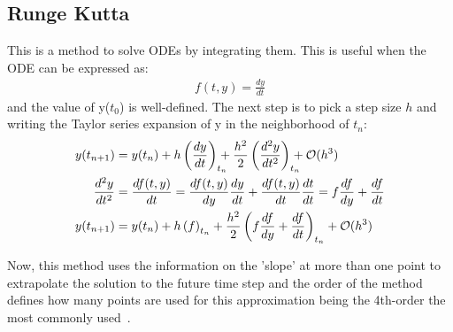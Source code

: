 \documentclass[class={myRUCProject}, crop=false]{standalone}
\begin{document}
\subsection{Runge Kutta}
This is a method to solve ODEs by integrating them. This is useful when the ODE can be expressed as:
\begin{align}
    f(t, y)= \frac{d y}{d t}
\end{align}
and the value of y($t_0$) is well-defined. \newline
The next step is to pick a step size $h$ and writing the Taylor series expansion of y in the neighborhood of $t_n$:
\begin{align}
    y(t_{n+1})&= y(t_{n}) +h \left(\frac{d y}{d t} \right)_{\mathrlap{t_{n}}}+\frac{h^2}{2} \left(\frac{d^2 y}{d t^2} \right)_{\mathrlap{t_{n}}}+ \clm{O}(h^3)\\
    \frac{d^2 y}{d t^2} &= \frac{d f(t,y)}{d t} = \frac{ d f(t,y)}{d y} \frac{d y}{d t} + \frac{ d f(t,y)}{d t}\frac{d t}{d t} = f\frac{d f}{d y} +\frac{d f}{d t}\\
    y(t_{n+1})&= y(t_{n}) +h \left(f \right)_{t_{n}}+\frac{h^2}{2} \left(f\frac{d f}{d y} +\frac{d f}{d t}\right)_{t_{n}}+ \clm{O}(h^3)
\end{align}

Now, this method uses the information on the 'slope' at more than one point to extrapolate the solution to the future time step and the order of the method defines how many points are used for this approximation being the 4th-order the most commonly used~\cite{Zeltkevic1998}.\newpage
\end{document}

